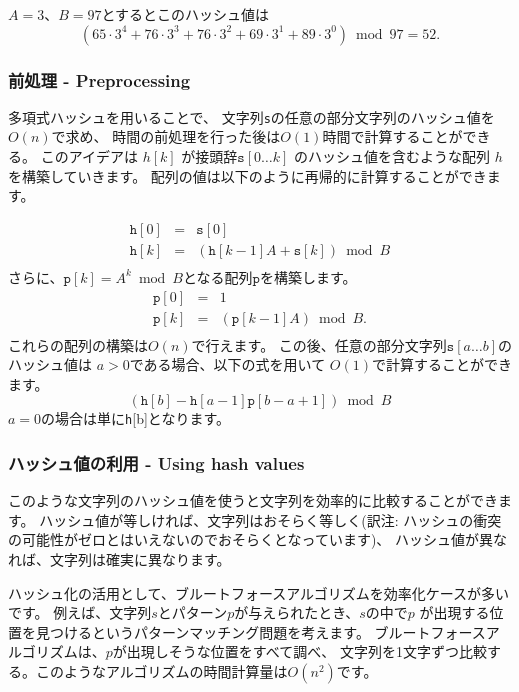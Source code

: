 $A=3$、$B=97$とするとこのハッシュ値は
\[(65 \cdot 3^4 + 76 \cdot 3^3 + 76 \cdot 3^2 + 69 \cdot 3^1 + 89 \cdot 3^0) \bmod 97 = 52.\]

\subsubsection*{前処理 - Preprocessing}

多項式ハッシュを用いることで、
文字列\texttt{s}の任意の部分文字列のハッシュ値を$O(n)$で求め、
時間の前処理を行った後は$O(1)$時間で計算することができる。
このアイデアは $h[k]$ が接頭辞$\texttt{s}[0 \ldots k]$
のハッシュ値を含むような配列 $h$ を構築していきます。
配列の値は以下のように再帰的に計算することができます。

\[
\begin{array}{lcl}
\texttt{h}[0] & = & \texttt{s}[0] \\
\texttt{h}[k] & = & (\texttt{h}[k-1] A + \texttt{s}[k]) \bmod B \\
\end{array}
\]
さらに、$\texttt{p}[k]=A^k \bmod B$となる配列$\texttt{p}$を構築します。
\[
\begin{array}{lcl}
\texttt{p}[0] & = & 1 \\
\texttt{p}[k] & = & (\texttt{p}[k-1] A) \bmod B. \\
\end{array}
\]
これらの配列の構築は$O(n)$で行えます。
この後、任意の部分文字列$\texttt{s}[a \ldots b]$のハッシュ値は
$a>0$である場合、以下の式を用いて $O(1)$で計算することができます。
\[(\texttt{h}[b]-\texttt{h}[a-1] \texttt{p}[b-a+1]) \bmod B\]
$a=0$の場合は単に\texttt{h}[b]となります。

\subsubsection*{ハッシュ値の利用 - Using hash values}

このような文字列のハッシュ値を使うと文字列を効率的に比較することができます。
ハッシュ値が等しければ、文字列はおそらく等しく(訳注: ハッシュの衝突の可能性がゼロとはいえないのでおそらくとなっています)、
ハッシュ値が異なれば、文字列は確実に異なります。

ハッシュ化の活用として、ブルートフォースアルゴリズムを効率化ケースが多いです。
例えば、文字列$s$とパターン$p$が与えられたとき、$s$の中で$p$
が出現する位置を見つけるというパターンマッチング問題を考えます。
ブルートフォースアルゴリズムは、$p$が出現しそうな位置をすべて調べ、
文字列を1文字ずつ比較する。このようなアルゴリズムの時間計算量は$O(n^2)$です。


